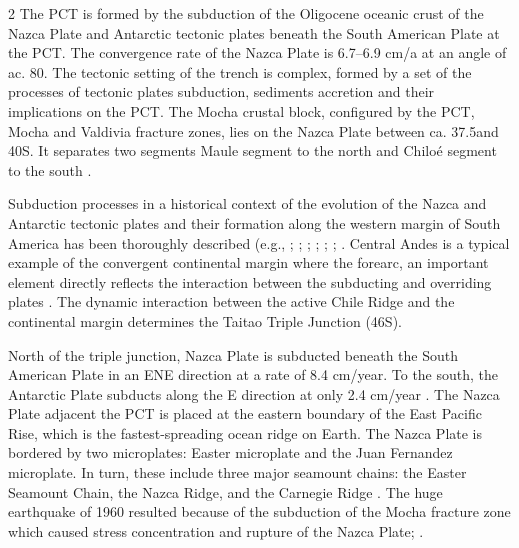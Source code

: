 \documentclass[11pt,a4paper]{report}
\begin{document}
\begin{multicols}{2}
The \ac{PCT} is formed by the subduction of the Oligocene oceanic crust of the Nazca Plate and Antarctic tectonic plates beneath the South American Plate at the \ac{PCT}. The convergence rate of the Nazca Plate is 6.7–6.9 cm/a at an angle of ac. 80\degree\space \cite{Geersen2019}. The tectonic setting of the trench is complex, formed by a set of the processes of tectonic plates subduction, sediments accretion and their implications on the \ac{PCT}. The Mocha crustal block, configured by the \ac{PCT}, Mocha and Valdivia fracture zones, lies on the Nazca Plate between ca. 37.5\degree\space and 40\degree\space S. It separates two segments Maule segment to the north and  Chiloé segment to the south \cite{Contrerasetal2010}. 

Subduction processes in a historical context of the evolution of the Nazca and Antarctic tectonic plates and their formation along the western margin of South America has been thoroughly described (e.g., \cite{Sarmientoetal2006}; \cite{Maneaetal2017}; \cite{Sdroliasetal2004}; \cite{Cande}; \cite{Scheuberetal1994}; \cite{Braz}; \cite{Schellartetal2006}. Central Andes is a typical example of the convergent continental margin where the forearc, an important element directly reflects the interaction between the subducting and overriding plates \cite{Matheretal2014}. The dynamic interaction between the active Chile Ridge and the continental margin determines the Taitao Triple Junction (46\degree\space S). 

North of the triple junction, Nazca Plate is subducted beneath the South American Plate in an ENE direction at a rate of 8.4 cm/year. To the south, the Antarctic Plate subducts along the E direction at only 2.4 cm/year \cite{CecioniPineda}. The Nazca Plate adjacent the \ac{PCT} is placed at the eastern boundary of the East Pacific Rise, which is the fastest-spreading ocean ridge on Earth. The Nazca Plate is bordered by two microplates: Easter microplate and the Juan Fernandez microplate. In turn, these include three major seamount chains: the Easter Seamount Chain, the Nazca Ridge, and the Carnegie Ridge \cite{Bello-Gonzalezetal2018}. The huge earthquake of 1960 resulted because of the subduction of the Mocha fracture zone which caused stress concentration and rupture of the Nazca Plate\cite{Cifuentes}; \cite{VitaFinzi}.


\end{multicols}
\end{document}
